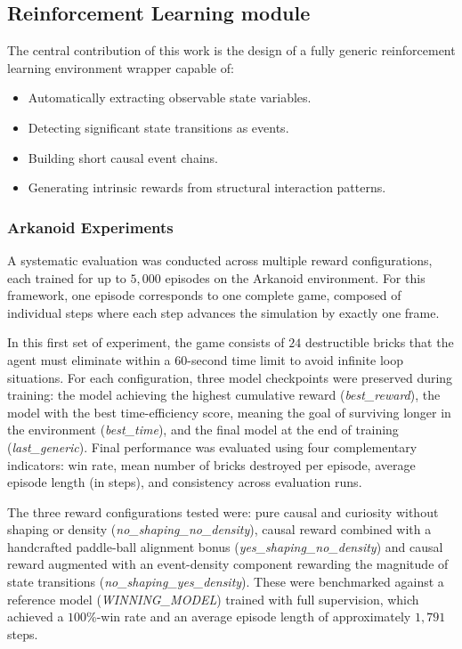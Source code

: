 \documentclass[12pt,a4paper]{report}
\begin{document}
\subsection{Reinforcement Learning module}
The central contribution of this work is the design of a fully generic reinforcement learning environment wrapper capable of:
\begin{itemize}
    \item Automatically extracting observable state variables.
    \item Detecting significant state transitions as events.
    \item Building short causal event chains.
    \item Generating intrinsic rewards from structural interaction patterns.
\end{itemize}

\subsubsection{Arkanoid Experiments}
A systematic evaluation was conducted across multiple reward configurations, each trained for up to $5{,}000$ episodes on the Arkanoid environment. 
For this framework, one episode corresponds to one complete game, composed of individual steps where each step advances the simulation by exactly one frame.

In this first set of experiment, the game consists of $24$ destructible bricks that the agent must eliminate within a $60$-second time limit to avoid infinite loop situations. 
For each configuration, three model checkpoints were preserved during training: the model achieving the highest cumulative reward (\textit{best\_reward}), the model with the best time-efficiency score, meaning the goal of surviving longer in the environment (\textit{best\_time}), and the final model at the end of training (\textit{last\_generic}). Final performance was evaluated using four complementary indicators: win rate, mean number of bricks destroyed per episode, average episode length (in steps), and consistency across evaluation runs.

The three reward configurations tested were: pure causal and curiosity without shaping or density (\textit{no\_shaping\_no\_density}), causal reward combined with a handcrafted paddle-ball alignment bonus (\textit{yes\_shaping\_no\_density}) and causal reward augmented with an event-density component rewarding the magnitude of state transitions (\textit{no\_shaping\_yes\_density}). These were benchmarked against a reference model (\textit{WINNING\_MODEL}) trained with full supervision, which achieved a $100$\%-win rate and an average episode length of approximately $1{,}791$ steps.
\end{document}
